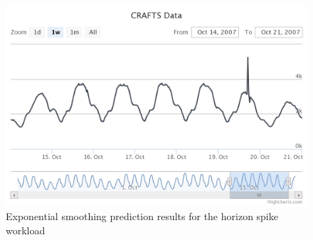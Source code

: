 \begin{figure}[H]
\centering
\includegraphics[width=\textwidth]{results/graphs/smoothing_horizon_spike.png}
\caption{Exponential smoothing prediction results for the horizon spike workload}
\label{fig:smoothing_hs}
\end{figure}
